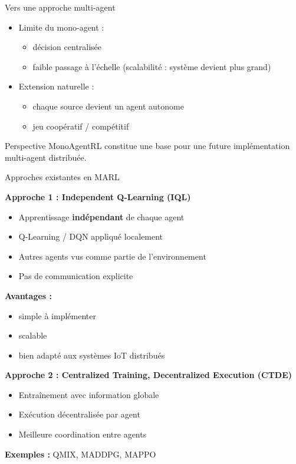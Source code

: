 \documentclass[aspectratio=169]{beamer}
\begin{document}
\begin{frame}{Vers une approche multi-agent}

\begin{itemize}
    \item Limite du mono-agent :
    \begin{itemize}
        \item décision centralisée
        \item faible passage à l’échelle (scalabilité : système devient plus grand)
    \end{itemize}

    \vspace{0.2cm}
    \item Extension naturelle :
    \begin{itemize}
        \item chaque source devient un agent autonome
        \item jeu coopératif / compétitif
    \end{itemize}
\end{itemize}

\begin{block}{Perspective}
MonoAgentRL constitue une base pour une future
implémentation multi-agent distribuée.
\end{block}

\end{frame}

\begin{frame}{Approches existantes en MARL}

\textbf{Approche 1 : Independent Q-Learning (IQL)}
\begin{itemize}
  \item Apprentissage \textbf{indépendant} de chaque agent
  \item Q-Learning / DQN appliqué localement
  \item Autres agents vus comme partie de l’environnement
  \item Pas de communication explicite
\end{itemize}

\textbf{Avantages :}
\begin{itemize}
  \item simple à implémenter
  \item scalable
  \item bien adapté aux systèmes IoT distribués
\end{itemize}

\bigskip

\textbf{Approche 2 : Centralized Training, Decentralized Execution (CTDE)}
\begin{itemize}
  \item Entraînement avec information globale
  \item Exécution décentralisée par agent
  \item Meilleure coordination entre agents
\end{itemize}

\textbf{Exemples :} QMIX, MADDPG, MAPPO

\end{frame}
\end{document}
